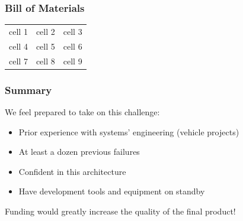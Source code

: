 \documentclass{beamer}
\begin{document}
\begin{frame}
\frametitle{Bill of Materials}
\begin{center}
\begin{tabular}{ c c c }
    cell 1 & cell 2 & cell 3 \\
    cell 4 & cell 5 & cell 6 \\
    cell 7 & cell 8 & cell 9
\end{tabular}
\end{center}
\end{frame}

\begin{frame}
\frametitle{Summary}
\large
We feel prepared to take on this challenge:
\begin{itemize}
    \item[\textbullet] Prior experience with systems' engineering (vehicle projects)
    \item[\textbullet] At least a dozen previous failures
    \item[\textbullet] Confident in this architecture
    \item[\textbullet] Have development tools and equipment on standby
\end{itemize}
\vspace{0.5in}
\begin{center}
Funding would greatly increase the quality of the final product!
\end{center}
\end{frame}
\end{document}
